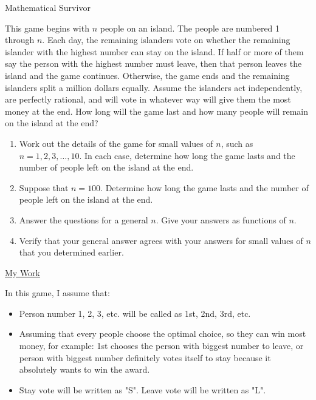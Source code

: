 \documentclass[12pt]{article}
\begin{document}
\newpage

\begin{center}

{\Large Mathematical Survivor} 

\end{center}

\vspace*{.2in}

\noindent This game begins with $n$ people on an island.  The people are numbered 1 through $n$.  Each day, the remaining islanders vote on whether the remaining islander with the highest number can stay on the island.  If half or more of them say the person with the highest number must leave, then that person leaves the island and the game continues.  Otherwise, the game ends and the remaining islanders split a million dollars equally.  Assume the islanders act independently, are perfectly rational, and will vote in whatever way will give them the most money at the end.  How long will the game last and how many people will remain on the island at the end?


\begin{enumerate}
  
\item Work out the details of the game for small values of $n$, such as $n=1, 2, 3, \dots, 10$.  In each case, determine how long the game lasts and the number of people left on the island at the end.

\item Suppose that $n=100$.  Determine how long the game lasts and the number of people left on the island at the end.

\item Answer the questions for a general $n$.  Give your answers as functions of $n$.

\item Verify that your general answer agrees with your answers for small values of $n$ that you determined earlier. 
\end{enumerate}

\newpage

\begin{center}
\underline{\Large{My Work}}
\end{center}

In this game, I assume that:
\begin{itemize}
    \item Person number 1, 2, 3, etc. will be called as 1st, 2nd, 3rd, etc.
    \item Assuming that every people choose the optimal choice, so they can win most money, for example: 1st chooses the person with biggest number to leave, or person with biggest number definitely votes itself to stay because it absolutely wants to win the award.
    \item Stay vote will be written as "S". Leave vote will be written as "L".
\end{itemize}
\end{document}
